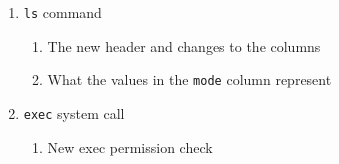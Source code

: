 \documentclass[11pt,letterpaper]{report}
\begin{document}
\begin{enumerate}
                                                                                                                                                                                                                                            \item {\tt ls} command          
                                                                                                                                                                                                                                                        \begin{enumerate}
                                                                                                                                                                                                                                                                        \item The new header and changes to the columns
                                                                                                                                                                                                                                                                                        \item What the values in the {\tt mode} column represent
                                                                                                                                                                                                                                                                                                    \end{enumerate}
                                                                                                                                                                                                                                                                                                            \item {\tt exec} system call          
                                                                                                                                                                                                                                                                                                                        \begin{enumerate}
                                                                                                                                                                                                                                                                                                                                        \item New exec permission check

\end{enumerate}
\end{enumerate}
\end{document}

